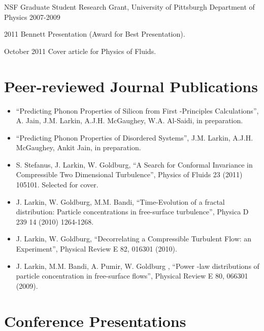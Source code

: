 \documentclass[letterpaper,12pt]{article}
\begin{document}
NSF Graduate Student Research Grant, University of Pittsburgh Department of Physics 2007-2009

2011 Bennett Presentation (Award for Best Presentation).

October 2011 Cover article for Physics of Fluids.

\section*{Peer-reviewed Journal Publications}

\begin{itemize}

\item “Predicting Phonon Properties of Silicon from First -Principles Calculations”, A. Jain, J.M. Larkin, A.J.H.
McGaughey, W.A. Al-Saidi, in preparation.

\item “Predicting Phonon Properties of Disordered Systems”, J.M. Larkin, A.J.H.
McGaughey, Ankit Jain, in preparation.

\item S. Stefanus, J. Larkin, W. Goldburg, “A Search for Conformal Invariance in Compressible Two
Dimensional Turbulence”, Physics of Fluids 23 (2011) 105101. Selected for cover.

\item J. Larkin, W. Goldburg, M.M. Bandi, “Time-Evolution of a fractal distribution: Particle concentrations
in free-surface turbulence”, Physica D 239 14 (2010) 1264-1268.

\item J. Larkin, W. Goldburg, “Decorrelating a Compressible Turbulent Flow: an Experiment”, Physical Review E
82, 016301 (2010).

\item J. Larkin, M.M. Bandi, A. Pumir, W. Goldburg , “Power -law distributions of particle concentration in
free-surface flows”, Physical Review E 80, 066301 (2009).

\end{itemize}

\section*{Conference Presentations}
\end{document}
